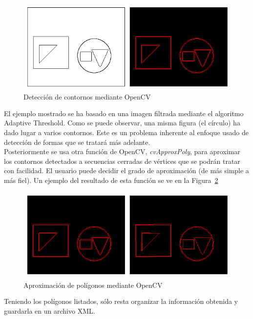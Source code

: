 {		\begin{figure}[!htbp]
		\centering
		\includegraphics[scale=0.47]{graphics/contourdetection.png}
		\caption{Detección de contornos mediante OpenCV}
		\label{fig:findcontours}
		\end{figure}
		
	El ejemplo mostrado se ha basado en una imagen filtrada mediante el algoritmo Adaptive Threshold. Como se puede observar, una misma figura (el círculo) ha dado lugar a varios contornos. Este es un problema inherente al enfoque usado de detección de formas que se tratará más adelante.\\
	
	Posteriormente se usa otra función de OpenCV, \emph{cvApproxPoly}, para aproximar los contornos detectados a secuencias cerradas de vértices que se podrán tratar con facilidad. El usuario puede decidir el grado de aproximación (de más simple a más fiel). Un ejemplo del resultado de esta función se ve en la Figura~\ref{fig:aproxpoly}\\
	
		\begin{figure}[!htbp]
		\centering
		\includegraphics[scale=0.47]{graphics/aproxpoly.png}
		\caption{Aproximación de polígonos mediante OpenCV}
		\label{fig:aproxpoly}
		\end{figure}
				
	Teniendo los polígonos listados, sólo resta organizar la información obtenida y guardarla en un archivo XML.\\
	
}
